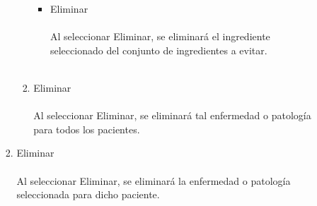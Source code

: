\begin{enumerate}
\begin{enumerate}
\begin{enumerate}
\begin{enumerate}
\begin{itemize}
\item Eliminar\\\\
Al seleccionar Eliminar, se eliminará el ingrediente seleccionado del conjunto de ingredientes a evitar.\\\\
\end{itemize}
\item Eliminar\\\\
Al seleccionar Eliminar, se eliminará tal enfermedad o patología para todos los pacientes.\\
\end{enumerate}
\item Eliminar\\\\
Al seleccionar Eliminar, se eliminará la enfermedad o patología seleccionada para dicho paciente.\\
\end{enumerate}
\end{enumerate}
\end{enumerate}


